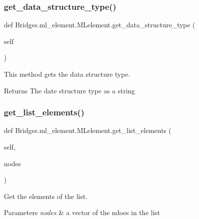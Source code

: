 \subsubsection{\texorpdfstring{get\+\_\+data\+\_\+structure\+\_\+type()}{get\_data\_structure\_type()}}
{\footnotesize\ttfamily def Bridges.\+ml\+\_\+element.\+M\+Lelement.\+get\+\_\+data\+\_\+structure\+\_\+type (\begin{DoxyParamCaption}\item[{}]{self }\end{DoxyParamCaption})}



This method gets the data structure type. 

\begin{DoxyReturn}{Returns}
The date structure type as a string 
\end{DoxyReturn}
\mbox{\label{class_bridges_1_1ml__element_1_1_m_lelement_a6919e148ee1e2cf867f30240bf890ee7}} 
\subsubsection{\texorpdfstring{get\+\_\+list\+\_\+elements()}{get\_list\_elements()}}
{\footnotesize\ttfamily def Bridges.\+ml\+\_\+element.\+M\+Lelement.\+get\+\_\+list\+\_\+elements (\begin{DoxyParamCaption}\item[{}]{self,  }\item[{}]{nodes }\end{DoxyParamCaption})}



Get the elements of the list. 


\begin{DoxyParams}{Parameters}
{\em nodes} & a vector of the ndoes in the list \\
\hline
\end{DoxyParams}
\mbox{\label{class_bridges_1_1ml__element_1_1_m_lelement_a0bceedd612ad350144d1bc2cd0634291}} 
